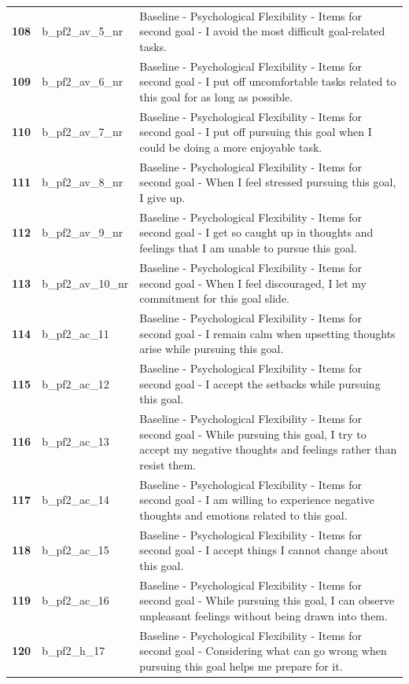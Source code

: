 \documentclass[
  letterpaper,
  DIV=11,
  numbers=noendperiod]{scrartcl}
\begin{document}
\begin{longtable}[t]{>{}cll}
\textbf{108} & b\_pf2\_av\_5\_nr & Baseline - Psychological Flexibility - Items for second goal - I avoid the most difficult goal-related tasks.\\
\textbf{109} & b\_pf2\_av\_6\_nr & Baseline - Psychological Flexibility - Items for second goal - I put off uncomfortable tasks related to this goal for as long as possible.\\
\textbf{110} & b\_pf2\_av\_7\_nr & Baseline - Psychological Flexibility - Items for second goal - I put off pursuing this goal when I could be doing a more enjoyable task.\\
\addlinespace
\textbf{111} & b\_pf2\_av\_8\_nr & Baseline - Psychological Flexibility - Items for second goal - When I feel stressed pursuing this goal, I give up.\\
\textbf{112} & b\_pf2\_av\_9\_nr & Baseline - Psychological Flexibility - Items for second goal - I get so caught up in thoughts and feelings that I am unable to pursue this goal.\\
\textbf{113} & b\_pf2\_av\_10\_nr & Baseline - Psychological Flexibility - Items for second goal - When I feel discouraged, I let my commitment for this goal slide.\\
\textbf{114} & b\_pf2\_ac\_11 & Baseline - Psychological Flexibility - Items for second goal - I remain calm when upsetting thoughts arise while pursuing this goal.\\
\textbf{115} & b\_pf2\_ac\_12 & Baseline - Psychological Flexibility - Items for second goal - I accept the setbacks while pursuing this goal.\\
\addlinespace
\textbf{116} & b\_pf2\_ac\_13 & Baseline - Psychological Flexibility - Items for second goal - While pursuing this goal, I try to accept my negative thoughts and feelings rather than resist them.\\
\textbf{117} & b\_pf2\_ac\_14 & Baseline - Psychological Flexibility - Items for second goal - I am willing to experience negative thoughts and emotions related to this goal.\\
\textbf{118} & b\_pf2\_ac\_15 & Baseline - Psychological Flexibility - Items for second goal - I accept things I cannot change about this goal.\\
\textbf{119} & b\_pf2\_ac\_16 & Baseline - Psychological Flexibility - Items for second goal - While pursuing this goal, I can observe unpleasant feelings without being drawn into them.\\
\textbf{120} & b\_pf2\_h\_17 & Baseline - Psychological Flexibility - Items for second goal - Considering what can go wrong when pursuing this goal helps me prepare for it.\\

\end{longtable}
\end{document}
